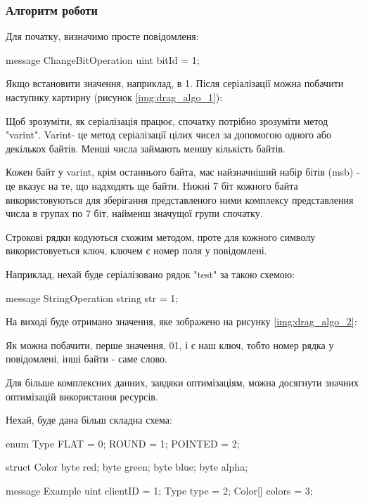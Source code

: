 \documentclass{lib/styles/default-style}
\begin{document}
    \subsubsection{Алгоритм роботи} 
    Для початку, визначимо просте повідомленя:

    \begin{snippet}
        message ChangeBitOperation {
            uint bitId = 1;
        }\end{snippet}
    
    Якщо встановити значення, наприклад, в 1.
    Після серіалізації можна побачити наступнку картирну (рисунок \ref{img:drag_algo_1}):


    Щоб зрозуміти, як серіалізація працює, спочатку потрібно зрозуміти метод "varint".
    Varint- це метод серіалізації цілих чисел за допомогою одного або декількох байтів.
    Менші числа займають меншу кількість байтів.

    Кожен байт у varint, крім останнього байта, має найзначніший набір бітів (msb) - це вказує на те,
    що надходять ще байти. 
    Нижні 7 біт кожного байта використовуються для зберігання представленого ними комплексу
    представлення числа в групах по 7 біт, найменш значущої групи спочатку.
    
    Строкові рядки кодуються схожим методом, проте для кожного символу використовуеться ключ, ключем є номер поля у повідомлені.

    Наприклад, нехай буде серіалізовано рядок "test" за такою схемою:

    \begin{snippet}
        message StringOperation {
            string str = 1;
        }\end{snippet}
    
    На виході буде отримано значення, яке зображено на рисунку \ref{img:drag_algo_2}:


    Як можна побачити, перше значення, 01, і є наш ключ, тобто номер рядка у повідомлені, інші байти - саме слово.
    
    Для більше комплексних данних, завдяки оптимізаціям, можна досягнути значних оптимізацій використання ресурсів.

    Нехай, буде дана більш складна схема:

    \begin{snippet}
        enum Type {
            FLAT = 0;
            ROUND = 1;
            POINTED = 2;
        }

        struct Color {
            byte red;
            byte green;
            byte blue;
            byte alpha;
        }

        message Example {
            uint clientID = 1;
            Type type = 2;
            Color[] colors = 3;
        }\end{snippet}
    
\end{document}
